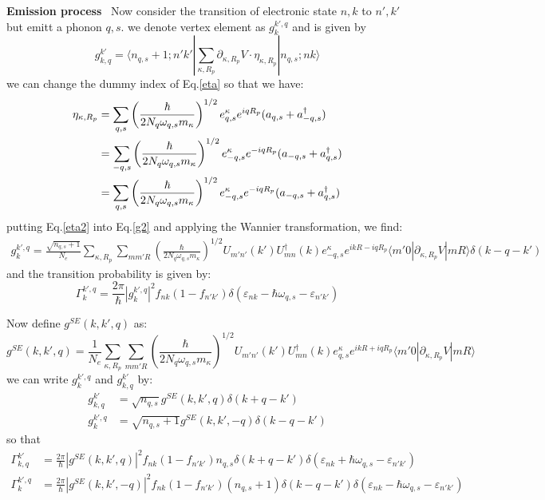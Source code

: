 \documentclass{article}
\begin{document}
\textbf{Emission process} \ Now consider the transition of electronic state $n,k$ to $n',k'$ but emitt a phonon
$q,s$. we denote vertex element as $g_{k}^{k',q} $ and is given by
\begin{equation}
    g_{k,q}^{k'} = \langle n_{q,s}+1;n'k' | \sum_{\kappa, R_p} \partial_{\kappa, R_p}V \cdot \eta_{\kappa, R_p} | n_{q,s};nk \rangle \label{g2}
\end{equation}
we can change the dummy index of Eq.\ref{eta} so that we have:
\begin{align}
    \eta_{\kappa, R_p} &= \sum_{q,s} \left( \frac{\hbar}{2N_q \omega_{q,s} m_{\kappa}} \right)^{1/2} e_{q,s}^{\kappa} e^{iqR_p} (a_{q,s} + a_{-q,s}^{\dagger}) \notag \\
                       &= \sum_{-q,s} \left( \frac{\hbar}{2N_q \omega_{q,s} m_{\kappa}} \right)^{1/2} e_{-q,s}^{\kappa} e^{-iqR_p} (a_{-q,s} + a_{q,s}^{\dagger}) \notag \\
                       &= \sum_{q,s} \left( \frac{\hbar}{2N_q \omega_{q,s} m_{\kappa}} \right)^{1/2} e_{-q,s}^{\kappa} e^{-iqR_p} (a_{-q,s} + a_{q,s}^{\dagger}) \label{eta2}
\end{align}
putting Eq.\ref{eta2} into Eq.\ref{g2} and applying the Wannier transformation, we find:
\begin{align}
    g_{k}^{k',q} = \frac{\sqrt{n_{q,s}+1}}{N_e} \sum_{\kappa, R_p} \sum_{mm'R} \left( \frac{\hbar}{2N_q \omega_{q,s} m_{\kappa}} \right)^{1/2} 
    U_{m'n'}(k') U^{\dagger}_{mn}(k) e_{-q,s}^{\kappa} e^{ikR - iqR_p}
             \langle m'0 | \partial_{\kappa, R_p}V | mR \rangle \delta(k-q-k') 
\end{align}
and the transition probability is given by:
\begin{equation}
    \Gamma_{k}^{k',q} = \frac{2\pi}{\hbar} |g_{k}^{k',q}|^2 f_{nk} (1-f_{n'k'}) \delta(\varepsilon_{nk} - \hbar\omega_{q,s} - \varepsilon_{n'k'})
\end{equation}

Now define $g^{SE}(k,k',q)$ as:
\begin{equation}
    g^{SE}(k,k',q) = \frac{1}{N_e} \sum_{\kappa, R_p} \sum_{mm'R} \left( \frac{\hbar}{2N_q \omega_{q,s} m_{\kappa}} \right)^{1/2} 
    U_{m'n'}(k') U^{\dagger}_{mn}(k) e_{q,s}^{\kappa} e^{ikR + iqR_p}
             \langle m'0 | \partial_{\kappa, R_p}V | mR \rangle 
\end{equation}
we can write $g_{k}^{k',q}$ and $g_{k,q}^{k'}$ by:
\begin{align}
    g_{k,q}^{k'} &= \sqrt{n_{q,s}} g^{SE}(k,k',q) \delta(k+q-k')  \\
    g_{k}^{k',q} &= \sqrt{n_{q,s}+1} g^{SE}(k,k',-q) \delta(k-q-k') 
\end{align}
so that 
\begin{align}
    \Gamma_{k,q}^{k'} &= \frac{2\pi}{\hbar} |g^{SE}(k,k',q)|^2 f_{nk} (1-f_{n'k'}) n_{q,s} \delta(k+q-k') \delta(\varepsilon_{nk} + \hbar\omega_{q,s} - \varepsilon_{n'k'}) \\
    \Gamma_{k}^{k',q} &= \frac{2\pi}{\hbar} |g^{SE}(k,k',-q)|^2 f_{nk} (1-f_{n'k'}) (n_{q,s}+1) \delta(k-q-k') \delta(\varepsilon_{nk} - \hbar\omega_{q,s} - \varepsilon_{n'k'}) 
\end{align}
\end{document}
